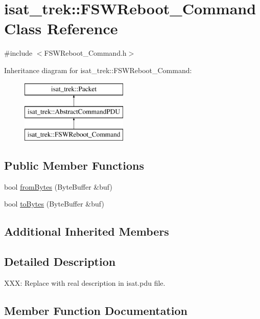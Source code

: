 \hypertarget{classisat__trek_1_1_f_s_w_reboot___command}{}\section{isat\+\_\+trek\+:\+:F\+S\+W\+Reboot\+\_\+\+Command Class Reference}
\label{classisat__trek_1_1_f_s_w_reboot___command}


{\ttfamily \#include $<$F\+S\+W\+Reboot\+\_\+\+Command.\+h$>$}

Inheritance diagram for isat\+\_\+trek\+:\+:F\+S\+W\+Reboot\+\_\+\+Command\+:\begin{figure}[H]
\begin{center}
\leavevmode
\includegraphics[height=3.000000cm]{classisat__trek_1_1_f_s_w_reboot___command}
\end{center}
\end{figure}
\subsection*{Public Member Functions}
\begin{DoxyCompactItemize}
\item 
bool \hyperlink{classisat__trek_1_1_f_s_w_reboot___command_a62441693935ded26f0bcf12081d9c21f}{from\+Bytes} (Byte\+Buffer \&buf)
\item 
bool \hyperlink{classisat__trek_1_1_f_s_w_reboot___command_a259ced73a3f10892df89015e7fa94868}{to\+Bytes} (Byte\+Buffer \&buf)
\end{DoxyCompactItemize}
\subsection*{Additional Inherited Members}


\subsection{Detailed Description}
X\+XX\+: Replace with real description in isat.\+pdu file. 

\subsection{Member Function Documentation}
